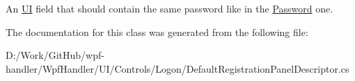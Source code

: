 An \mbox{\hyperlink{namespace_wpf_handler_1_1_u_i}{UI}} field that should contain the same password like in the \mbox{\hyperlink{class_wpf_handler_1_1_u_i_1_1_controls_1_1_logon_1_1_default_registration_panel_descriptor_ac525bd60f8febfaa251aeaebed55f515}{Password}} one. 



The documentation for this class was generated from the following file\+:\begin{DoxyCompactItemize}
\item 
D\+:/\+Work/\+Git\+Hub/wpf-\/handler/\+Wpf\+Handler/\+U\+I/\+Controls/\+Logon/Default\+Registration\+Panel\+Descriptor.\+cs\end{DoxyCompactItemize}
